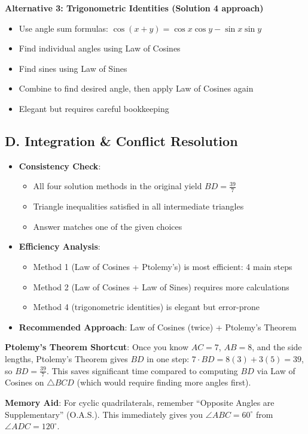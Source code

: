 \documentclass[11pt]{article}
\begin{document}
\begin{techniquesbox}
\textbf{Alternative 3: Trigonometric Identities (Solution 4 approach)}
\begin{itemize}
    \item Use angle sum formulas: $\cos(x+y) = \cos x \cos y - \sin x \sin y$
    \item Find individual angles using Law of Cosines
    \item Find sines using Law of Sines
    \item Combine to find desired angle, then apply Law of Cosines again
    \item Elegant but requires careful bookkeeping
\end{itemize}

\subsection*{D. Integration \& Conflict Resolution}
\begin{itemize}[leftmargin=*]
    \item \textbf{Consistency Check}: 
    \begin{itemize}
        \item All four solution methods in the original yield $BD = \frac{39}{7}$
        \item Triangle inequalities satisfied in all intermediate triangles
        \item Answer matches one of the given choices
    \end{itemize}
    
    \item \textbf{Efficiency Analysis}: 
    \begin{itemize}
        \item Method 1 (Law of Cosines + Ptolemy's) is most efficient: 4 main steps
        \item Method 2 (Law of Cosines + Law of Sines) requires more calculations
        \item Method 4 (trigonometric identities) is elegant but error-prone
    \end{itemize}
    
    \item \textbf{Recommended Approach}: Law of Cosines (twice) + Ptolemy's Theorem
\end{itemize}
\end{techniquesbox}

\begin{protip}
\textbf{Ptolemy's Theorem Shortcut}: Once you know $AC = 7$, $AB = 8$, and the side lengths, Ptolemy's Theorem gives $BD$ in one step: $7 \cdot BD = 8(3) + 3(5) = 39$, so $BD = \frac{39}{7}$. This saves significant time compared to computing $BD$ via Law of Cosines on $\triangle BCD$ (which would require finding more angles first).

\textbf{Memory Aid}: For cyclic quadrilaterals, remember ``Opposite Angles are Supplementary'' (O.A.S.). This immediately gives you $\angle ABC = 60^\circ$ from $\angle ADC = 120^\circ$.
\end{protip}
\end{document}
